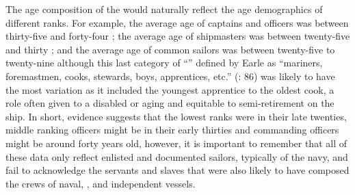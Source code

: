 The age composition of the  would naturally reflect the age demographics of different ranks. For example, the average age of captains and officers was between thirty-five and forty-four \citep[86]{Earle1998}; the average age of shipmasters was between twenty-five and thirty \citep[38-39]{Walsh1994}; and the average age of common sailors was between twenty-five to twenty-nine \citep[86]{Earle1998} although this last category of “” defined by Earle as “mariners, foremastmen, cooks, stewards, boys, apprentices, etc.” (\citeyear{Earle1998}: 86) was likely to have the most variation as it included the youngest apprentice to the oldest cook, a role often given to a disabled or aging  and equitable to semi-retirement on the ship. In short, evidence suggests that the lowest ranks were in their late twenties, middle ranking officers might be in their early thirties and commanding officers might be around forty years old, however, it is important to remember that all of these data only reflect enlisted and documented sailors, typically of the navy, and fail to acknowledge the servants and slaves that were also likely to have composed the crews of naval, , and independent vessels. 

